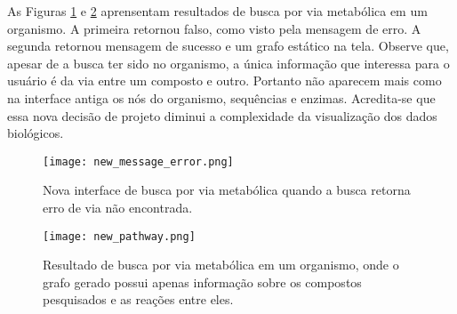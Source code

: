 \indent As Figuras \ref{fig:new_message_error} e \ref{fig:new_pathway} aprensentam resultados de busca por via metabólica em um organismo. A primeira retornou falso, como visto pela mensagem de erro. A segunda retornou mensagem de sucesso e um grafo estático na tela. Observe que, apesar de a busca ter sido no organismo, a única informação que interessa para o usuário é da via entre um composto e outro. Portanto não aparecem mais como na interface antiga os nós do organismo, sequências e enzimas. Acredita-se que essa nova decisão de projeto diminui a complexidade da visualização dos dados biológicos.


\begin{figure}[!h]
    \centering
    \texttt{[image: new\_message\_error.png]}
    \caption{Nova interface de busca por via metabólica quando a busca retorna erro de via não encontrada.}
    \label{fig:new_message_error}
\end{figure}


\begin{figure}[!t]
    \centering
    \texttt{[image: new\_pathway.png]}
    \caption{Resultado de busca por via metabólica em um organismo, onde o grafo gerado possui apenas informação sobre os compostos pesquisados e as reações entre eles.}
    \label{fig:new_pathway}
\end{figure}




